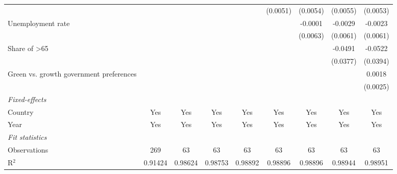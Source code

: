 \begin{table}[htbp]
\begin{tabular}{lcccccccc}
                                                                       &               &          &              &                & (0.0051)       & (0.0054)       & (0.0055)       & (0.0053)\\   
      Unemployment rate                                                &               &          &              &                &                & -0.0001        & -0.0029        & -0.0023\\   
                                                                       &               &          &              &                &                & (0.0063)       & (0.0061)       & (0.0061)\\   
      Share of >65                                                     &               &          &              &                &                &                & -0.0491        & -0.0522\\   
                                                                       &               &          &              &                &                &                & (0.0377)       & (0.0394)\\   
      Green vs. growth government preferences                          &               &          &              &                &                &                &                & 0.0018\\   
                                                                       &               &          &              &                &                &                &                & (0.0025)\\   
      \midrule
      \emph{Fixed-effects}\\
      Country                                                          & Yes           & Yes      & Yes          & Yes            & Yes            & Yes            & Yes            & Yes\\  
      Year                                                             & Yes           & Yes      & Yes          & Yes            & Yes            & Yes            & Yes            & Yes\\  
      \midrule
      \emph{Fit statistics}\\
      Observations                                                     & 269           & 63       & 63           & 63             & 63             & 63             & 63             & 63\\  
      R$^2$                                                            & 0.91424       & 0.98624  & 0.98753      & 0.98892        & 0.98896        & 0.98896        & 0.98944        & 0.98951\\  

\end{tabular}
\end{table}
